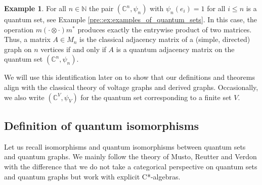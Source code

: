 \documentclass{amsart}
\newcommand{\C}{\mathbb{C}}
\newcommand{\N}{\mathbb{N}}
\theoremstyle{definition}
\newtheorem{example}[thm]{Example}
\theoremstyle{definition}
\begin{document}
\begin{example}
    \label{pre::ex:classical_graphs_as_quantum_graphs}
    For all $n \in \N$ the pair $(\C^n, \psi_n)$ with $\psi_n(e_i) = 1$ for all $i \leq n$ is a quantum set, see Example \ref{pre::ex:examples_of_quantum_sets}. In this case, the operation $m(\cdot \otimes \cdot)m^\ast$ produces exactly the entrywise product of two matrices. Thus, a matrix $A \in M_n$ is the classical adjacency matrix of a (simple, directed) graph on $n$ vertices if and only if $A$ is a quantum adjacency matrix on the quantum set $(\C^n, \psi_n)$. 
    
    We will use this identification later on to show that our definitions and theorems align with the classical theory of voltage graphs and derived graphs. Occasionally, we also write $(\C^V, \psi_V)$ for the quantum set corresponding to a finite set $V$.
\end{example}


\subsection{Definition of quantum isomorphisms}

Let us recall isomorphisms and quantum isomorphisms between quantum sets and quantum graphs. We mainly follow the theory of Musto, Reutter and Verdon \cite{musto_compositional_2018} with the difference that we do not take a categorical perspective on quantum sets and quantum graphs but work with explicit C*-algebras. 
\end{document}
